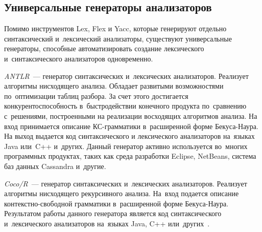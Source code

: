 \subsection{Универсальные генераторы анализаторов} \label{sub118}

Помимо инструментов Lex, Flex и Yacc, которые генерируют отдельно синтаксический и~лексический анализаторы, существуют универсальные генераторы, способные автоматизировать создание лексического и~синтаксического анализаторов одновременно. 

\textit{ANTLR}~--- генератор синтаксических и~лексических анализаторов. Реализует алгоритмы нисходящего анализа. Обладает развитыми возможностями по~оптимизации таблиц разбора. За счет этого достигается конкурентоспособность в~быстродействии конечного продукта по~сравнению с~решениями, построенными на реализации восходящих алгоритмов анализа.
На вход принимается описание КС-грамматики в~расширенной форме Бекуса-Наура. На выход выдается код синтаксического и лексического анализаторов на~языках Java или~C++ и~других. Данный генератор активно
используется во~многих программных продуктах, таких как среда разработки Eclipse, NetBeans, система баз данных Cassandra и~другие.

\textit{Coco/R}~--- генератор синтаксических и~лексических анализаторов. Реализует алгоритмы нисходящего рекурсивного анализа. На~вход подается описание контекстно-свободной грамматики в~расширенной форме Бекуса-Наура. Результатом работы данного генератора является код синтаксического и~лексического анализаторов на~языках Java, C++ или~других~\cite{dskMag}.